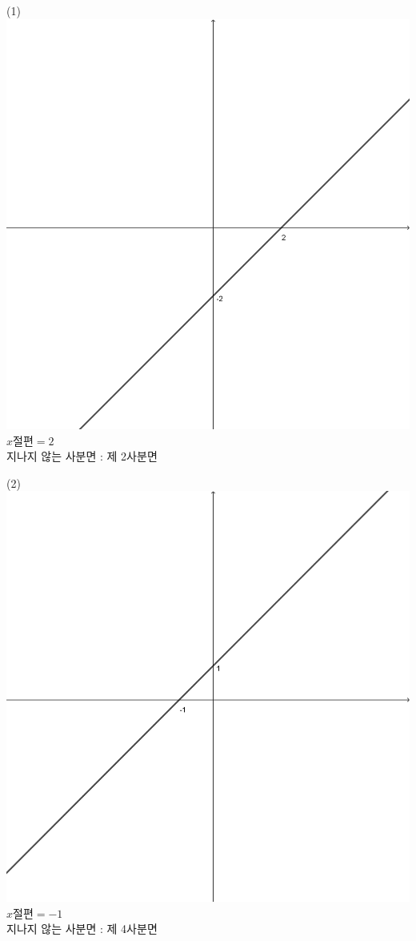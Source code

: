 \documentclass{article}
\begin{document}
\newpage
\noindent
\begin{minipage}{0.3\textwidth}
    \centering
    (1)
    \includegraphics[width=\textwidth]{graph_1.png}\\
    $x\text{절편}=2$\\
    지나지 않는 사분면 : 제 2사분면
\end{minipage}
\begin{minipage}{0.3\textwidth}
    \centering
    (2)
    \includegraphics[width=\textwidth]{graph_2.png}\\
    $x\text{절편}=-1$\\
    지나지 않는 사분면 : 제 4사분면
\end{minipage}
\end{document}
